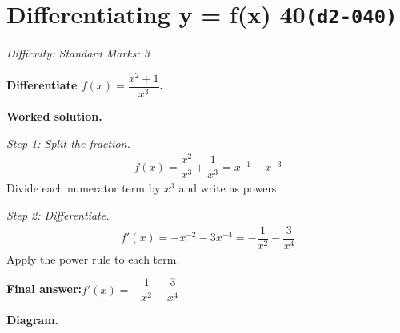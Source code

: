 \documentclass[11pt]{article}
\newcommand{\question}[1]{\par\medskip\noindent\textbf{#1}\par}
\begin{document}
\section*{Differentiating y = f(x) 40\quad\small\texttt{(d2-040)}}
\textit{Difficulty: Standard \quad\textbar\quad Marks: 3}

\question{Differentiate \( f(x) = \dfrac{x^2 + 1}{x^3} \).}

\textbf{Worked solution.}

\textit{Step 1: Split the fraction.}
\[\begin{gathered}
f(x) = \dfrac{x^2}{x^3} + \dfrac{1}{x^3} = x^{-1} + x^{-3}
\end{gathered}\]
Divide each numerator term by \( x^3 \) and write as powers.

\textit{Step 2: Differentiate.}
\[\begin{gathered}
f'(x) = -x^{-2} - 3x^{-4} = -\dfrac{1}{x^2} - \dfrac{3}{x^4}
\end{gathered}\]
Apply the power rule to each term.

\begin{answerbox}
\textbf{Final answer:}\quad \(\displaystyle  f'(x) = -\dfrac{1}{x^2} - \dfrac{3}{x^4} \)
\end{answerbox}
\textbf{Diagram.}
\end{document}
